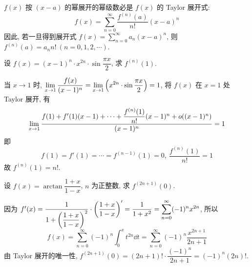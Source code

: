 \begin{theorem}
    $f(x)$ 按 $(x-a)$ 的幂展开的幂级数必是 $f(x)$ 的 Taylor 展开式:
    $$f(x) =\sum ^{\infty }_{n=0}\dfrac{f^{(n) }(a) }{n!}(x-a) ^{n}$$
    因此, 若一旦得到展开式 $\displaystyle f(x)=\sum_{n=0}^{\infty}a_n(x-a)^n$, 则 $f^{(n)}(a)=a_nn!~  (n=0,1,2,\cdots).$
\end{theorem}

\begin{example}
    设 $f(x)=(x-1)^n\cdot x^{2n}\cdot\sin\dfrac{\pi x}{2}$, 求 $f^{(n)}(1).$
\end{example}
\begin{solution}
    当 $x\to1$ 时, $\displaystyle\lim_{x\to1}\dfrac{f(x)}{(x-1)^n}=\lim_{x\to1}\qty(x^{2n}\cdot\sin\dfrac{\pi x}{2})=1$, 将 $f(x)$ 在 $x=1$ 处 Taylor 展开, 有
    $$\lim_{x\to1}\dfrac{f(1)+f'(1)(x-1)+\cdots+\dfrac{f^{(n)}(1)}{n!}(x-1)^n+o\qty((x-1)^{n})}{(x-1)^n}=1$$
    即 $$f(1)=f'(1)=\cdots=f^{(n-1)}(1)=0,~\dfrac{f^{(n)}(1)}{n!}=1$$
    故 $f^{(n)}(1)=n!.$
\end{solution}

\begin{example}
    设 $f(x)=\arctan\dfrac{1+x}{1-x}$, $n$ 为正整数, 求 $f^{(2n+1)}(0)$.
\end{example}
\begin{solution}
    因为 $f'(x)=\dfrac{1}{1+\qty(\dfrac{1+x}{1-x})^2}\cdot\qty(\dfrac{1+x}{1-x})'=\dfrac{1}{1+x^2}=\displaystyle \sum_{n=0}^{\infty} (-1)^{n}x^{2n}$, 所以 
    $$
    f(x)=\sum_{n=0}^{\infty} (-1)^{n}\int_{0}^{x} t^{2n} \dd t=\sum_{n=0}^{\infty} (-1)^{n}\dfrac{x^{2n+1}}{2n+1}
    $$
    由 Taylor 展开的唯一性, $f^{(2n+1)}(0)=(2n+1)!\cdot\dfrac{(-1)^{n}}{2n+1}=(-1)^{n}(2n)!.$
\end{solution}

